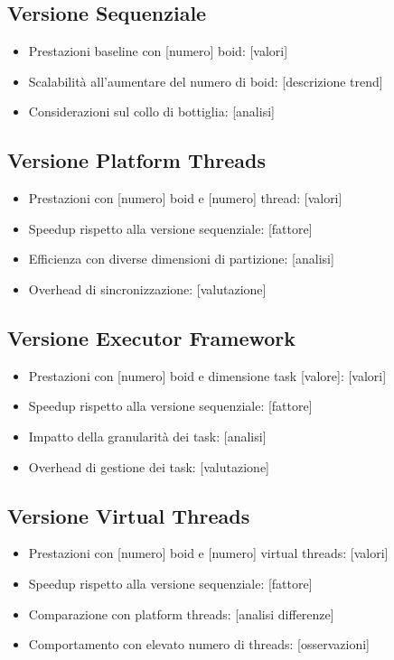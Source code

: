 \documentclass[a4paper,12pt]{report}
\begin{document}
\subsection{Versione Sequenziale}
\begin{itemize}
    \item Prestazioni baseline con [numero] boid: [valori]
    \item Scalabilità all'aumentare del numero di boid: [descrizione trend]
    \item Considerazioni sul collo di bottiglia: [analisi]
\end{itemize}

\subsection{Versione Platform Threads}
\begin{itemize}
    \item Prestazioni con [numero] boid e [numero] thread: [valori]
    \item Speedup rispetto alla versione sequenziale: [fattore]
    \item Efficienza con diverse dimensioni di partizione: [analisi]
    \item Overhead di sincronizzazione: [valutazione]
\end{itemize}

\subsection{Versione Executor Framework}
\begin{itemize}
    \item Prestazioni con [numero] boid e dimensione task [valore]: [valori]
    \item Speedup rispetto alla versione sequenziale: [fattore]
    \item Impatto della granularità dei task: [analisi]
    \item Overhead di gestione dei task: [valutazione]
\end{itemize}

\subsection{Versione Virtual Threads}
\begin{itemize}
    \item Prestazioni con [numero] boid e [numero] virtual threads: [valori]
    \item Speedup rispetto alla versione sequenziale: [fattore]
    \item Comparazione con platform threads: [analisi differenze]
    \item Comportamento con elevato numero di threads: [osservazioni]
\end{itemize}
\end{document}
